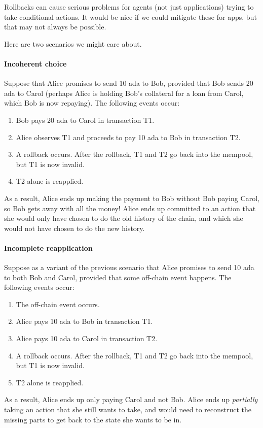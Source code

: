 \begin{requirement}
\label{req:app-rollback}
Rollbacks can cause serious problems for agents (not just applications) trying to take conditional actions.
It would be nice if we could mitigate these for \glspl{app}, but that may not always be possible.

Here are two scenarios we might care about.

\paragraph{Incoherent choice}
\label{para:incoherent-choice}
Suppose that Alice promises to send 10 \gls{ada} to Bob, provided that Bob sends 20 \gls{ada} to Carol (perhaps Alice is holding Bob's collateral for a loan from Carol, which Bob is now repaying).
The following events occur:
\begin{enumerate}
\item Bob pays 20 \gls{ada} to Carol in transaction T1.
\item Alice observes T1 and proceeds to pay 10 \gls{ada} to Bob in transaction T2.
\item A rollback occurs. After the rollback, T1 and T2 go back into the mempool, but T1 is now invalid.
\item T2 alone is reapplied.
\end{enumerate}

As a result, Alice ends up making the payment to Bob without Bob paying Carol, so Bob gets away with all the money!
Alice ends up committed to an action that she would only have chosen to do the old history of the chain, and which she would not have chosen to do the new history.

\paragraph{Incomplete reapplication}
\label{para:incomplete-reapplication}
Suppose as a variant of the previous scenario that Alice promises to send 10 \gls{ada} to both Bob and Carol, provided that some off-chain event happens.
The following events occur:
\begin{enumerate}
\item The off-chain event occurs.
\item Alice pays 10 \gls{ada} to Bob in transaction T1.
\item Alice pays 10 \gls{ada} to Carol in transaction T2.
\item A rollback occurs. After the rollback, T1 and T2 go back into the mempool, but T1 is now invalid.
\item T2 alone is reapplied.
\end{enumerate}

As a result, Alice ends up only paying Carol and not Bob.
Alice ends up \emph{partially} taking an action that she still wants to take, and would need to reconstruct the missing parts to get back to the state she wants to be in.
\end{requirement}

